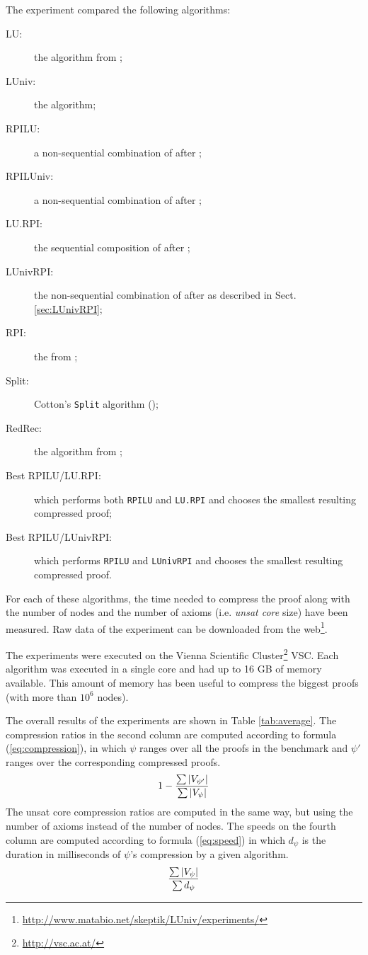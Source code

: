 \documentclass{llncs}
\begin{document}
The experiment compared the following algorithms:
\begin{description}
  \item[LU:] the {\LowerUnits} algorithm from \cite{LURPI};
  \item[LUniv:] the {\LowerUnivalents} algorithm;
  \item[RPILU:] a non-sequential combination of {\RPI} after {\LowerUnits};
  \item[RPILUniv:] a non-sequential combination of {\RPI} after {\LowerUnivalents};
  \item[LU.RPI:] the sequential composition of {\LowerUnits} after {\RPI};
  \item[LUnivRPI:] the non-sequential combination of {\LowerUnivalents} after {\RPI} as described in Sect. \ref{sec:LUnivRPI};
  \item[RPI:] the {\RecyclePivotsIntersection} from \cite{LURPI};
  \item[Split:] Cotton's \texttt{Split} algorithm (\cite{CottonSplit});
  \item[RedRec:] the {\ReduceReconstruct} algorithm from \cite{RedRec};
  \item[Best RPILU/LU.RPI:] which performs both \texttt{RPILU} and \texttt{LU.RPI} and chooses the smallest resulting compressed proof;
  \item[Best RPILU/LUnivRPI:] which performs \texttt{RPILU} and \texttt{LUnivRPI} and chooses the smallest resulting
    compressed proof.
\end{description}

For each of these algorithms, the time needed to compress the proof along with the number of nodes
and the number of axioms (i.e. \emph{unsat core} size) have been measured. Raw data of the
experiment can be downloaded from the web\footnote{\url{http://www.matabio.net/skeptik/LUniv/experiments/}}.

The experiments were executed on the Vienna Scientific Cluster\footnote{\url{http://vsc.ac.at/}}
VSC. Each algorithm was executed in a single core and had up to 16 GB of memory available. This amount of memory has been useful to compress the biggest proofs (with more than $10^6$ nodes).


The overall results of the experiments are shown in Table \ref{tab:average}. The compression ratios
in the second column are computed according to formula (\ref{eq:compression}), in which $\psi$
ranges over all the proofs in the benchmark and $\psi'$ ranges over the corresponding compressed
proofs.
\begin{equation} \label{eq:compression}
  1 - \frac{ \sum {|V_{\psi'}|} }{ \sum {|V_{\psi}|} }
\end{equation}
The unsat core compression ratios are computed in the same way, but using the number of axioms instead of
the number of nodes. The speeds on the fourth column are computed according to formula
(\ref{eq:speed}) in which $d_{\psi}$ is the duration in milliseconds of $\psi$'s compression by a
given algorithm.
\begin{equation} \label{eq:speed}
  \frac{ \sum {|V_{\psi}|} }{ \sum {d_{\psi}} }
\end{equation}
\end{document}
